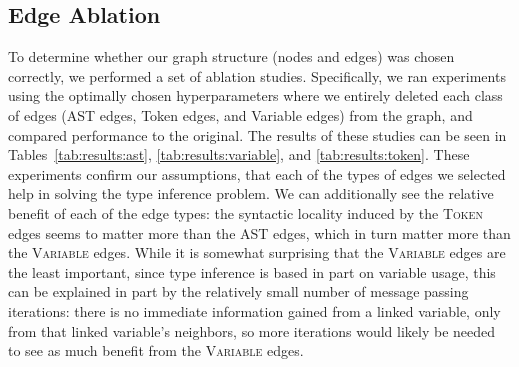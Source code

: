 \subsection{Edge Ablation}
To determine whether our graph structure (nodes and edges) was chosen correctly, we performed a set of ablation studies.
Specifically, we ran experiments using the optimally chosen hyperparameters where we entirely deleted each class of edges (AST edges, Token edges, and Variable edges) from the graph, and compared performance to the original.
The results of these studies can be seen in Tables~\ref{tab:results:ast}, \ref{tab:results:variable}, and \ref{tab:results:token}.
These experiments confirm our assumptions, that each of the types of edges we selected help in solving the type inference problem.
We can additionally see the relative benefit of each of the edge types: the syntactic locality induced by the \textsc{Token} edges seems to matter more than the AST edges, which in turn matter more than the \textsc{Variable} edges.
While it is somewhat surprising that the \textsc{Variable} edges are the least important, since type inference is based in part on variable usage, this can be explained in part by the relatively small number of message passing iterations: there is no immediate information gained from a linked variable, only from that linked variable's neighbors, so more iterations would likely be needed to see as much benefit from the \textsc{Variable} edges.